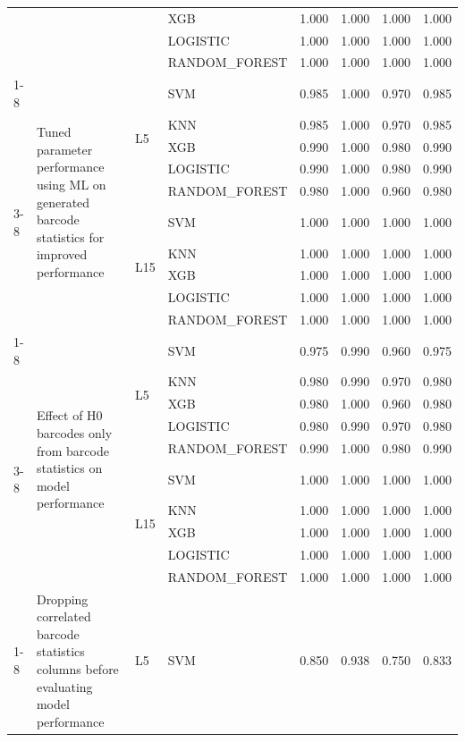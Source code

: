 \begin{table}
\begin{tabular}{llllrrrr}
 &  &  & XGB & 1.000 & 1.000 & 1.000 & 1.000 \\
 &  &  & LOGISTIC & 1.000 & 1.000 & 1.000 & 1.000 \\
 &  &  & RANDOM\_FOREST & 1.000 & 1.000 & 1.000 & 1.000 \\
\cline{1-8} \cline{2-8} \cline{3-8}
\multirow[t]{10}{*}{Experiment 4} & \multirow[t]{10}{*}{Tuned parameter performance using ML on generated barcode statistics for improved performance} & \multirow[t]{5}{*}{L5} & SVM & 0.985 & 1.000 & 0.970 & 0.985 \\
 &  &  & KNN & 0.985 & 1.000 & 0.970 & 0.985 \\
 &  &  & XGB & 0.990 & 1.000 & 0.980 & 0.990 \\
 &  &  & LOGISTIC & 0.990 & 1.000 & 0.980 & 0.990 \\
 &  &  & RANDOM\_FOREST & 0.980 & 1.000 & 0.960 & 0.980 \\
\cline{3-8}
 &  & \multirow[t]{5}{*}{L15} & SVM & 1.000 & 1.000 & 1.000 & 1.000 \\
 &  &  & KNN & 1.000 & 1.000 & 1.000 & 1.000 \\
 &  &  & XGB & 1.000 & 1.000 & 1.000 & 1.000 \\
 &  &  & LOGISTIC & 1.000 & 1.000 & 1.000 & 1.000 \\
 &  &  & RANDOM\_FOREST & 1.000 & 1.000 & 1.000 & 1.000 \\
\cline{1-8} \cline{2-8} \cline{3-8}
\multirow[t]{10}{*}{Experiment 5} & \multirow[t]{10}{*}{Effect of H0 barcodes only from barcode statistics on model performance} & \multirow[t]{5}{*}{L5} & SVM & 0.975 & 0.990 & 0.960 & 0.975 \\
 &  &  & KNN & 0.980 & 0.990 & 0.970 & 0.980 \\
 &  &  & XGB & 0.980 & 1.000 & 0.960 & 0.980 \\
 &  &  & LOGISTIC & 0.980 & 0.990 & 0.970 & 0.980 \\
 &  &  & RANDOM\_FOREST & 0.990 & 1.000 & 0.980 & 0.990 \\
\cline{3-8}
 &  & \multirow[t]{5}{*}{L15} & SVM & 1.000 & 1.000 & 1.000 & 1.000 \\
 &  &  & KNN & 1.000 & 1.000 & 1.000 & 1.000 \\
 &  &  & XGB & 1.000 & 1.000 & 1.000 & 1.000 \\
 &  &  & LOGISTIC & 1.000 & 1.000 & 1.000 & 1.000 \\
 &  &  & RANDOM\_FOREST & 1.000 & 1.000 & 1.000 & 1.000 \\
\cline{1-8} \cline{2-8} \cline{3-8}
\multirow[t]{10}{*}{Experiment 6} & \multirow[t]{10}{*}{Dropping correlated barcode statistics columns before evaluating model performance} & \multirow[t]{5}{*}{L5} & SVM & 0.850 & 0.938 & 0.750 & 0.833 \\

\end{tabular}
\end{table}
